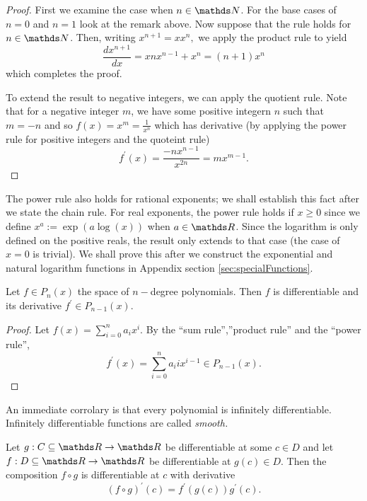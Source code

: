 \begin{proof}
	First we examine the case when $n\in\N$. For the base cases of $n=0$
	and $n=1$ look at the remark above. Now suppose that the rule holds
	for $n\in\N$. Then, writing $x^{n+1}=xx^{n},$ we apply the product
	rule to yield
	\[
	\frac{dx^{n+1}}{dx}=xnx^{n-1}+x^{n}=\left(n+1\right)x^{n}
	\]
	which completes the proof.
	
	To extend the result to negative integers, we can apply the quotient
	rule. Note that for a negative integer $m$, we have some positive
	integern $n$ such that $m=-n$ and so $f\left(x\right)=x^{m}=\frac{1}{x^{n}}$
	which has derivative (by applying the power rule for positive integers
	and the quoteint rule)
	\[
	f^{\prime}\left(x\right)=\frac{-nx^{n-1}}{x^{2n}}=mx^{m-1}.
	\]
\end{proof}
\begin{rem*}
	The power rule also holds for rational exponents; we shall establish
	this fact after we state the chain rule. For real exponents, the power
	rule holds if $x\geq0$ since we define $x^{a}:=\exp\left(a\log\left(x\right)\right)$
	when $a\in\R$. Since the logarithm is only defined on the positive
	reals, the result only extends to that case (the case of $x=0$ is
	trivial). We shall prove this after we construct the exponential and
	natural logarithm functions in Appendix section \ref{sec:specialFunctions}.
\end{rem*}
\begin{prop}
	\label{prop:differentiabilityOfPolynomials}Let $f\in P_{n}\left(x\right)$
	the space of $n-$degree polynomials. Then $f$ is differentiable
	and its derivative $f^{\prime}\in P_{n-1}\left(x\right).$
\end{prop}

\begin{proof}
	Let $f\left(x\right)=\sum_{i=0}^{n}a_{i}x^{i}.$ By the ``sum rule'',''product
	rule'' and the ``power rule'', 
	\[
	f^{\prime}\left(x\right)=\sum_{i=0}^{n}a_{i}ix^{i-1}\in P_{n-1}\left(x\right).
	\]
\end{proof}
\begin{rem*}
	An immediate corrolary is that every polynomial is infinitely differentiable.
	Infinitely differentiable functions are called \emph{smooth.}
\end{rem*}
\begin{thm}
	\label{thm:chainRuleR}Let $g:C\subseteq\R\to\R$ be differentiable
	at some $c\in D$ and let $f:D\subseteq\R\to\R$ be differentiable
	at $g\left(c\right)\in D.$ Then the composition $f\circ g$ is differentiable
	at $c$ with derivative 
	\[
	\left(f\circ g\right)^{\prime}\left(c\right)=f^{\prime}\left(g\left(c\right)\right)g^{\prime}\left(c\right).
	\]
\end{thm}

